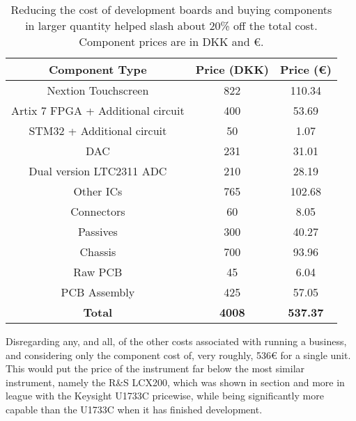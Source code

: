 \begin{table}[H]
    \centering
    \renewcommand{\arraystretch}{1.5}
    \setlength{\tabcolsep}{8pt}
    \begin{tabular}{|c|c|c|}
    \hline
    \textbf{Component Type} & \textbf{Price (DKK)} & \textbf{Price (€)} \\ \hline
    Nextion Touchscreen & 822 & 110.34 \\ \hline
    Artix 7 FPGA + Additional circuit & 400 & 53.69 \\ \hline
    STM32 + Additional circuit & 50 & 1.07 \\ \hline
    DAC & 231 & 31.01 \\ \hline
    Dual version LTC2311 ADC & 210 & 28.19 \\ \hline
    Other ICs & 765 & 102.68 \\ \hline
    Connectors & 60 & 8.05 \\ \hline
    Passives & 300 & 40.27 \\ \hline
    Chassis & 700 & 93.96 \\ \hline
    Raw PCB & 45 & 6.04 \\ \hline
    PCB Assembly & 425 & 57.05 \\ \hline
    \textbf{Total} & \textbf{4008} & \textbf{537.37} \\ \hline
    \end{tabular}
    \caption{Reducing the cost of development boards and buying components in larger quantity helped slash about 20\% off the total cost. Component prices are in DKK and €.}
    \label{tab:ComponentTypeAndPrice2}
\end{table}

Disregarding any, and all, of the other costs associated with running a business, and considering only the component cost of, very roughly, 536€ for a single unit. This would put the price of the instrument far below the most similar instrument, namely the R\&S LCX200, which was shown in section  and more in league with the Keysight U1733C pricewise, while being significantly more capable than the U1733C when it has finished development.
